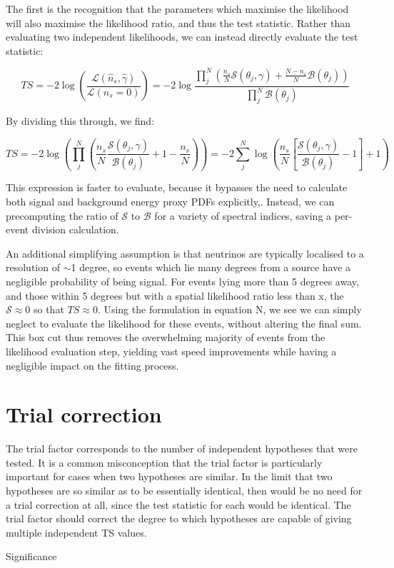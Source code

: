 The first is the recognition that the parameters which maximise the likelihood will also maximise the likelihood ratio, and thus the test statistic. Rather than evaluating two independent likelihoods, we can instead directly evaluate the test statistic:

\[ TS = - 2 \log \left( \frac{ \mathcal{L}(\hat{n}_{s}, \hat{\gamma}) }{\mathcal{L}(n_{s} = 0)} \right) = -2 \log  \frac{\prod_{j}^{N} \left(\frac{n_{s}}{N} \mathcal{S}(\theta_{j}, \gamma) + \frac{N - n_{s}}{N} \mathcal{B}(\theta_{j})  \right)}{\prod_{j}^{N}\mathcal{B}(\theta_{j}) }\]

By dividing this through, we find: 

\[ TS =  -2 \log \left(  \prod_{j}^{N} \left(\frac{n_{s}}{N} \frac{\mathcal{S}(\theta_{j}, \gamma)}{\mathcal{B}(\theta_{j}) } + 1 - \frac{n_{s}}{N} \right) \right)  = - 2 \sum_{j}^{N} \log \left(\frac{n_{s}}{N} \left[ \frac{\mathcal{S}(\theta_{j}, \gamma)}{\mathcal{B}(\theta_{j}) } - 1 \right] + 1 \right) \]

This expression is faster to evaluate, because it bypasses the need to calculate both signal and background energy proxy PDFs explicitly,. Instead, we can precomputing the ratio of $\mathcal{S}$ to $\mathcal{B}$ for a variety of spectral indices, saving a per-event division calculation.

An additional simplifying assumption is that neutrinos are typically localised to a resolution of $\sim$1 degree, so events which lie many degrees from a source have a negligible probability of being signal. For events lying more than 5 degrees away, and those within 5 degrees but with a spatial likelihood ratio less than x, the $\mathcal{S} \approx 0$ so that $TS \approx 0$. Using the formulation in equation N, we see we can simply neglect to evaluate the likelihood for these events, without altering the final sum. This box cut thus removes the overwhelming majority of events from the likelihood evaluation step, yielding vast speed improvements while having a negligible impact on the fitting process.
\section{Trial correction}


The trial factor corresponds to the number of independent hypotheses that were tested. It is a common misconception that the trial factor is particularly important for cases when two hypotheses are similar. In the limit that two hypotheses are so similar as to be essentially identical, then would be no need for a trial correction at all, since the test statistic for each would be identical. The trial factor should correct the degree to which hypotheses are capable of giving multiple independent TS values.

Significance